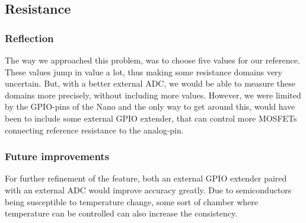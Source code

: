 \subsection{Resistance}
\label{sec:discussion_resistance}

\subsubsection{Reflection}
The way we approached this problem, was to choose five values for our reference. These values jump in value a lot, thus making some resistance domains very uncertain. But, with a better external ADC, we would be able to measure these domains more precisely, without including more values. However, we were limited by the GPIO-pins of the Nano and the only way to get around this, would have been to include some external GPIO extender, that can control more MOSFETs connecting reference resistance to the analog-pin.

\subsubsection{Future improvements}
For further refinement of the feature, both an external GPIO extender paired with an external ADC would improve accuracy greatly. Due to semiconductors being susceptible to temperature change, some sort of chamber where temperature can be controlled can also increase the consistency.